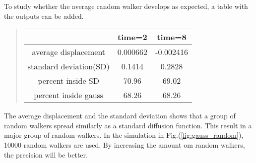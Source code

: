 \documentclass[%
twoside,                 %
final,                   %
chapterprefix=true,      %
open=right               %
10pt]{book}
\newcommand{\clearemptydoublepage}{\clearpage{\pagestyle{empty}\cleardoublepage}}
\begin{document}
To study whether the average random walker develops as expected, a table with the outputs can be added. 

\label{table:gauss_random}

\begin{quote}
\begin{tabular}{ccc}
\hline
\multicolumn{1}{c}{  } & \multicolumn{1}{c}{ time=2 } & \multicolumn{1}{c}{ time=8 } \\
\hline
average displacement   & 0.000662 & -0.002416 \\
standard deviation(SD) & 0.1414   & 0.2828    \\
percent inside SD      & 70.96    & 69.02     \\
percent inside gauss   & 68.26    & 68.26     \\
\hline
\end{tabular}
\end{quote}

\noindent
The average displacement and the standard deviation shows that a group of random walkers spread similarly as a standard diffusion function. This result in a major group of random walkers. In the simulation in Fig.(\ref{fig:gauss_random}), 10000 random walkers are used. By increasing the amount om random walkers, the precision will be better.



\clearemptydoublepage
{}
\thispagestyle{empty}







\clearemptydoublepage
{}
\thispagestyle{empty}
\printindex
\end{document}
